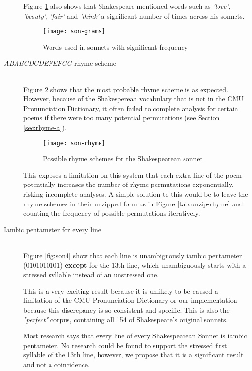 \begin{description}
Figure \ref{fig:son-grams} also shows that Shakespeare mentioned words such as \textit{'love'}, \textit{'beauty'}, \textit{'fair'} and \textit{'think'} a significant number of times across his sonnets.

\begin{figure}[H]
\centering
\texttt{[image: son-grams]}
\caption{Words used in sonnets with significant frequency}
\label{fig:son-grams}
\end{figure}

\item[\textit{ABABCDCDEFEFGG} rhyme scheme]  \hfill \\
Figure \ref{fig:son-rhyme} shows that the most probable rhyme scheme is as expected. However, because of the Shakesperean vocabulary that is not in the CMU Pronunciation Dictionary, it often failed to complete analysis for certain poems if there were too many potential permutations (see Section \ref{sec:rhyme-a}). 

\begin{figure}[H]
\centering
\texttt{[image: son-rhyme]}
\caption{Possible rhyme schemes for the Shakespearean sonnet}
\label{fig:son-rhyme}
\end{figure}

This exposes a limitation on this system that each extra line of the poem potentially increases the number of rhyme permutations exponentially, risking incomplete analyses. A simple solution to this would be to leave the rhyme schemes in their unzipped form as in Figure \ref{tab:unzip-rhyme} and counting the frequency of possible permutations iteratively.

\item[Iambic pentameter for every line]  \hfill \\
Figure \ref{fig:son4} show that each line is unambiguously iambic pentameter (0101010101) \textbf{except} for the 13th line, which unambiguously starts with a stressed syllable instead of an unstressed one.

This is a very exciting result because it is unlikely to be caused a limitation of the CMU Pronunciation Dictionary or our implementation because this discrepancy is so consistent and specific. This is also the \textit{"perfect"} corpus, containing all 154 of Shakespeare's original sonnets.

Most research says that every line of every Shakespearean Sonnet is iambic pentameter. No research could be found to support the stressed first syllable of the 13th line, however, we propose that it is a significant result and not a coincidence.


\end{description}
